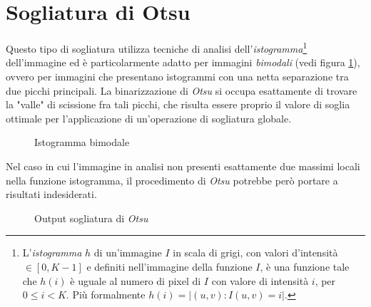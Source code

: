 \section{Sogliatura di Otsu}
\label{sec:image-bin-otsu}
Questo tipo di sogliatura utilizza tecniche di analisi dell'\textit{istogramma}\footnote{L'\textit{istogramma} $h$ di un'immagine $I$ in scala di grigi, con valori d'intensit\`a $\in [0, K - 1]$ e definiti nell'immagine della funzione $I$,  \`e una funzione tale che $h(i)$ \`e uguale al numero di pixel di $I$ con valore di intensit\`a $i$, per $0 \leq i < K$. Pi\`u formalmente $h(i)=|{(u, v)\colon I(u, v)=i}|$.} dell'immagine ed \`e particolarmente adatto per immagini \textit{bimodali} (vedi figura \ref{fig:bimodal-hist}), ovvero per immagini che presentano istogrammi con una netta separazione tra due picchi principali. La binarizzazione di \textit{Otsu} si occupa esattamente di trovare la "valle" di scissione fra tali picchi, che risulta essere proprio il valore di soglia ottimale per l'applicazione di un'operazione di sogliatura globale.\par
\pgfplotsset{compat=1.16,width=13cm,height=7cm}
\begin{figure}[t]
	\centering
	\caption{Istogramma bimodale} \label{fig:bimodal-hist}
\end{figure}
Nel caso in cui l'immagine in analisi non presenti esattamente due massimi locali nella funzione istogramma, il procedimento di \textit{Otsu} potrebbe per\`o portare a risultati indesiderati.
\begin{figure}[H]
	\centering
	\caption{Output sogliatura di \textit{Otsu}}
	\label{fig:image-bin-otsu}
\end{figure}

